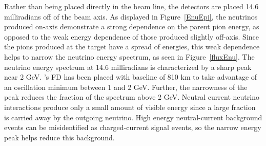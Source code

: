 Rather than being placed directly in the \numi beam line, the \nova detectors are placed 14.6 milliradians off of the beam axis.  As displayed in Figure~\ref{EnuEpi}, the neutrinos produced on-axis demonstrate a strong dependence on the parent pion energy, as opposed to the weak energy dependence of those produced slightly off-axis.  Since the pions produced at the target have a spread of energies, this weak dependence helps to narrow the neutrino energy spectrum, as seen in Figure~\ref{fluxEnu}.  The neutrino energy spectrum at 14.6 milliradians is characterized by a sharp peak near 2 GeV.  \nova's FD has been placed with baseline of 810 km to take advantage of an oscillation minimum between 1 and 2 GeV.  Further, the narrowness of the peak reduces the fraction of the spectrum above 2 GeV.  Neutral current neutrino interactions produce only a small amount of visible energy since a large fraction is carried away by the outgoing neutrino.  High energy neutral-current background events can be misidentified as charged-current signal events, so the narrow energy peak helps reduce this background.
